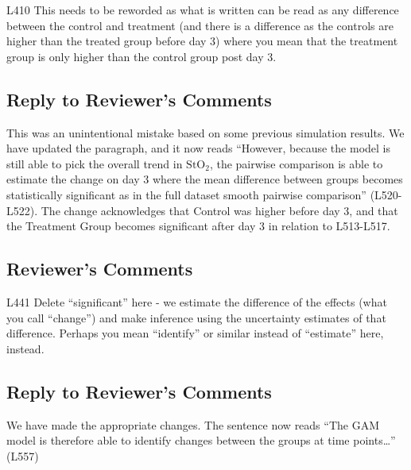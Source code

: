 \documentclass[
]{article}
\begin{document}
L410 This needs to be reworded as what is written can be read as any difference between the control and treatment (and there is a difference as the controls are higher than the treated group before day 3) where you mean that the treatment group is only higher than the control group post day 3.

\hypertarget{section-37}{%
\subsection{\texorpdfstring{\textcolor{reviewersblue} {Reply to Reviewer's Comments}}{}}\label{section-37}}

This was an unintentional mistake based on some previous simulation results. We have updated the paragraph, and it now reads ``However, because the model is still able to pick the overall trend in \(\mbox{StO}_2\), the pairwise comparison is able to estimate the change on day 3 where the mean difference between groups becomes statistically significant as in the full dataset smooth pairwise comparison'' (L520-L522). The change acknowledges that Control was higher before day 3, and that the Treatment Group becomes significant after day 3 in relation to L513-L517.

\hypertarget{reviewers-comments-37}{%
\subsection{Reviewer's Comments}\label{reviewers-comments-37}}

L441 Delete ``significant'' here - we estimate the difference of the effects (what you call ``change'') and make inference using the uncertainty estimates of that difference. Perhaps you mean ``identify'' or similar instead of ``estimate'' here, instead.

\hypertarget{section-38}{%
\subsection{\texorpdfstring{\textcolor{reviewersblue} {Reply to Reviewer's Comments}}{}}\label{section-38}}

We have made the appropriate changes. The sentence now reads ``The GAM model is therefore able to identify changes between the groups at time points\ldots{}'' (L557)
\end{document}
